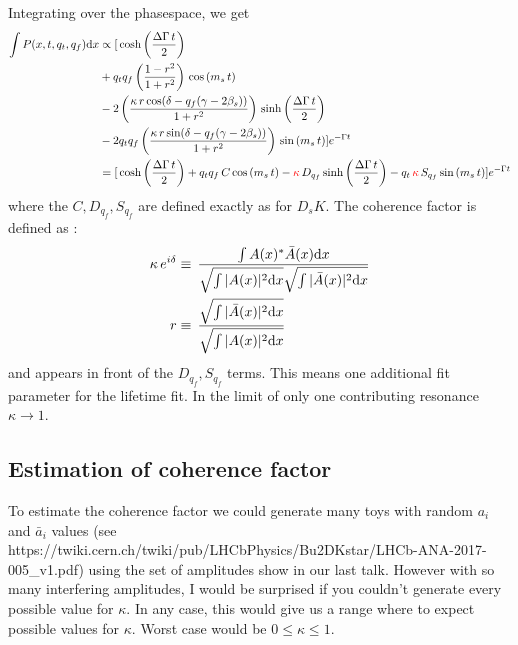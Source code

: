 Integrating over the phasespace, we get
\begin{equation}
\begin{split}
\label{eq:PDF_intX}
	\int P(x,t,q_t,q_f) \text d x &\propto   [
	\, \text{cosh} \left( \frac{\Delta \Gamma \, t}{2}\right) \\
	 & + q_t q_f \left( \frac{1-r^2}{1+r^2} \right) \, \text{cos} \left( m_s \, t \right)  \\
	 & -2 \left( \frac{\kappa \, r \, \text{cos}(\delta - q_f(\gamma - 2 \beta_s))}{1+r^2}  \right) \, \text{sinh} \left( \frac{\Delta \Gamma \, t}{2}\right)  \\
	 & -2 q_t q_f \left( \frac{\kappa \, r \, \text{sin}(\delta - q_f(\gamma - 2 \beta_s))}{1+r^2}   \right)\, \text{sin} \left( m_s \, t \right)  ]  e^{- \Gamma t} \\
	 &=   [
	\, \text{cosh} \left( \frac{\Delta \Gamma \, t}{2}\right) 
	  + q_t q_f \, C \, \text{cos} \left( m_s \, t \right)  
	  - \textcolor{red}{\kappa} \, D_{q_f} \, \text{sinh} \left( \frac{\Delta \Gamma \, t}{2}\right)  
	  - q_t \, \textcolor{red}{\kappa} \, S_{q_f}\, \text{sin} \left( m_s \, t \right)  ]  e^{- \Gamma t}
\end{split}
\end{equation}
where the $C,D_{q_f},S_{q_f}$ are defined exactly as for $D_s K$.
The coherence factor is defined as :
\begin{align}
\label{eq:coherenceFactor}
	\kappa \, e^{i\delta} &\equiv \, \frac{\int A(x)^{*}  \bar A(x)  \text d x}{\sqrt{\int \vert A(x) \vert^2\text d x} \sqrt{\int \vert \bar A(x) \vert^2\text d x}  } \\
	r &\equiv \, \frac{\sqrt{\int \vert \bar A(x) \vert^2\text d x }}{\sqrt{\int \vert A(x) \vert^2\text d x}} 
\end{align}
and appears in front of the $D_{q_f},S_{q_f}$  terms.
This means one additional fit parameter for the lifetime fit.
In the limit of only one contributing resonance $\kappa \to 1$. \\


\subsection{Estimation of coherence factor}

To estimate the coherence factor we could generate many toys with random $a_i$ and $\bar a_i$ values (see https://twiki.cern.ch/twiki/pub/LHCbPhysics/Bu2DKstar/LHCb-ANA-2017-005\_v1.pdf) using the set of amplitudes show in our last talk. However with so many interfering amplitudes, I would be surprised if you couldn't generate every possible value for $\kappa$. In any case, this would give us a  range where to expect possible values for $\kappa$. Worst case would be $0 \leq \kappa \leq 1$. \\

